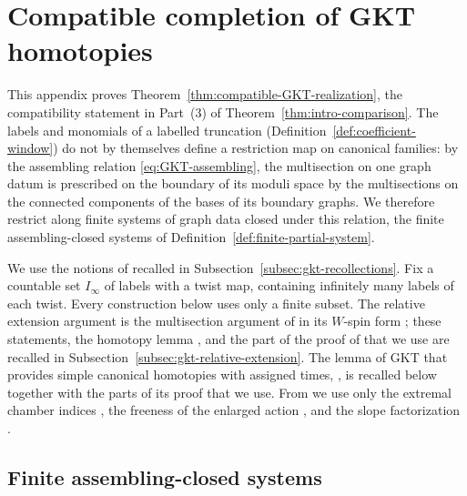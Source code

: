 \section{Compatible completion of GKT homotopies}
\label{app:gkt-completion}

This appendix proves Theorem~\ref{thm:compatible-GKT-realization}, the
compatibility statement in Part~(3) of Theorem~\ref{thm:intro-comparison}.
The labels and monomials of a labelled truncation
(Definition~\ref{def:coefficient-window}) do not by themselves define a
restriction map on canonical families: by the assembling relation
\eqref{eq:GKT-assembling}, the multisection on one graph datum is prescribed
on the boundary of its moduli space by the multisections on the connected
components of the bases of its boundary graphs.  We therefore restrict along
finite systems of graph data closed under this relation, the finite
assembling-closed systems of Definition~\ref{def:finite-partial-system}.

We use the notions of \cite{grossetal2022open} recalled in
Subsection~\ref{subsec:gkt-recollections}.  Fix a countable set
$I_\infty$ of labels with a twist map, containing infinitely many labels
of each twist.  Every construction below uses only a finite subset.  The
relative extension argument is the multisection argument of
\cite[Lem.~6.5]{buryaketal2024} in its $W$-spin form
\cite[Lem.~5.15]{grossetal2022open}; these statements, the homotopy lemma
\cite[Lem.~5.17]{grossetal2022open}, and the part of the proof of
\cite[Thm.~5.13]{grossetal2022open} that we use are recalled in
Subsection~\ref{subsec:gkt-relative-extension}.  The lemma of GKT that
provides simple canonical homotopies with assigned times,
\cite[Lem.~3.40]{grossetal2022open}, is recalled below together with the
parts of its proof that we use.  From
\cite{wuebben2026boundary} we use only the extremal chamber indices
\cite[Thm.~1.1]{wuebben2026boundary}, the freeness of the enlarged action
\cite[Lem.~2.5]{wuebben2026boundary}, and the slope factorization
\cite[Prop.~3.1]{wuebben2026boundary}.

\subsection{Finite assembling-closed systems}

